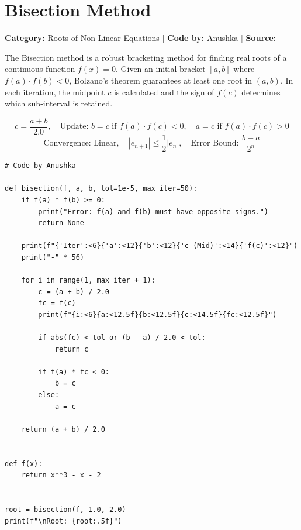 \documentclass[10pt,a4paper]{report}
\begin{document}
\section{Bisection Method}
\textbf{Category:} \textcolor{secondary}{Roots of Non-Linear Equations} \quad | \quad \textbf{Code by:} \textcolor{secondary}{Anushka} \quad | \quad \textbf{Source:} \texttt{}

The Bisection method is a robust bracketing method for finding real roots of a continuous function $f(x) = 0$. Given an initial bracket $[a, b]$ where $f(a) \cdot f(b) < 0$, Bolzano's theorem guarantees at least one root in $(a, b)$. In each iteration, the midpoint $c$ is calculated and the sign of $f(c)$ determines which sub-interval is retained.

\begin{tcolorbox}[colback=theorybg,colframe=theoryframe,title=\textbf{Mathematical Theory \& Formulation},boxrule=1pt,arc=2mm]
\[
c = \frac{a + b}{2.0}, \quad \text{Update: } b = c \text{ if } f(a) \cdot f(c) < 0, \quad a = c \text{ if } f(a) \cdot f(c) > 0
\]
\[
\text{Convergence: Linear}, \quad |e_{n+1}| \le \frac{1}{2}|e_n|, \quad \text{Error Bound: } \frac{b - a}{2^n}
\]
\end{tcolorbox}

\begin{tcolorbox}[colback=codebg,colframe=secondary,title=\textbf{Python Implementation (Step-by-Step Loops \& Pure Functions)},boxrule=1pt,arc=2mm]
\begin{lstlisting}[style=python_detailed]
# Code by Anushka

def bisection(f, a, b, tol=1e-5, max_iter=50):
    if f(a) * f(b) >= 0:
        print("Error: f(a) and f(b) must have opposite signs.")
        return None

    print(f"{'Iter':<6}{'a':<12}{'b':<12}{'c (Mid)':<14}{'f(c)':<12}")
    print("-" * 56)

    for i in range(1, max_iter + 1):
        c = (a + b) / 2.0
        fc = f(c)
        print(f"{i:<6}{a:<12.5f}{b:<12.5f}{c:<14.5f}{fc:<12.5f}")

        if abs(fc) < tol or (b - a) / 2.0 < tol:
            return c

        if f(a) * fc < 0:
            b = c
        else:
            a = c

    return (a + b) / 2.0


def f(x):
    return x**3 - x - 2


root = bisection(f, 1.0, 2.0)
print(f"\nRoot: {root:.5f}")

\end{lstlisting}
\end{tcolorbox}
\end{document}
